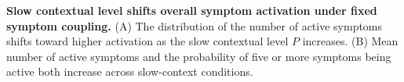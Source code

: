 
\caption{\textbf{Slow contextual level shifts overall symptom activation under fixed symptom coupling.}
(A) The distribution of the number of active symptoms shifts toward higher activation as the slow contextual level \(P\) increases.
(B) Mean number of active symptoms and the probability of five or more symptoms being active both increase across slow-context conditions.}
